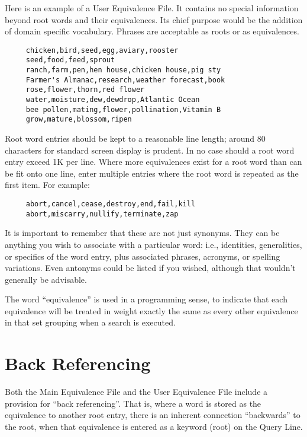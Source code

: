 Here is an example of a User Equivalence File.  It contains no special
information beyond root words and their equivalences.  Its chief
purpose would be the addition of domain specific vocabulary.  Phrases
are acceptable as roots or as equivalences.

\begin{verbatim}
     chicken,bird,seed,egg,aviary,rooster
     seed,food,feed,sprout
     ranch,farm,pen,hen house,chicken house,pig sty
     Farmer's Almanac,research,weather forecast,book
     rose,flower,thorn,red flower
     water,moisture,dew,dewdrop,Atlantic Ocean
     bee pollen,mating,flower,pollination,Vitamin B
     grow,mature,blossom,ripen
\end{verbatim}

Root word entries should be kept to a reasonable line length; around
80 characters for standard screen display is prudent.  In no case
should a root word entry exceed 1K per line.  Where more equivalences
exist for a root word than can be fit onto one line, enter multiple
entries where the root word is repeated as the first item.  For
example:

\begin{verbatim}
     abort,cancel,cease,destroy,end,fail,kill
     abort,miscarry,nullify,terminate,zap
\end{verbatim}

It is important to remember that these are not just synonyms.  They
can be anything you wish to associate with a particular word:  i.e.,
identities, generalities, or specifics of the word entry, plus
associated phrases, acronyms, or spelling variations.  Even antonyms
could be listed if you wished, although that wouldn't generally be
advisable.

The word ``equivalence'' is used in a programming sense, to indicate
that each equivalence will be treated in weight exactly the same as
every other equivalence in that set grouping when a search is
executed.


\section{Back Referencing}

Both the Main Equivalence File and the User Equivalence File include a
provision for ``back referencing''.  That is, where a word is stored
as the equivalence to another root entry, there is an inherent
connection ``backwards'' to the root, when that equivalence is entered
as a keyword (root) on the Query Line.

